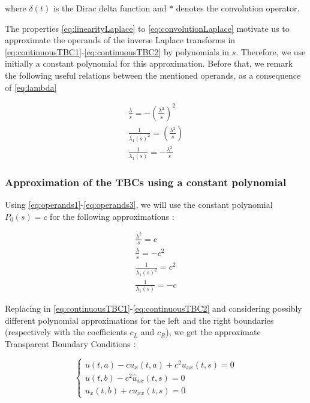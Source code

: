 \noindent where $\delta (t)$ is the Dirac delta function and $*$ denotes the convolution operator.

\indent The properties \eqref{eq:linearityLaplace} to \eqref{eq:convolutionLaplace} motivate us to approximate the operands of the inverse Laplace transforms in \eqref{eq:continuousTBC1}-\eqref{eq:continuousTBC2} by polynomials in $s$. Therefore, we use initially a constant polynomial for this approximation. Before that, we remark the following useful relations between the mentioned operands, as a consequence of \eqref{eq:lambda}

\begin{gather}
	\label{eq:operands1}
	\frac{\lambda}{s}  = -\left( \frac{\lambda^2}{s} \right)^2 \\
	\label{eq:operands2}
	\frac{1}{\lambda_1(s)^2}  = \left( \frac{\lambda^2}{s} \right) \\
	\label{eq:operands3}
	 \frac{1}{\lambda_1(s)}  = -\frac{\lambda^2}{s}
\end{gather}

\subsubsection{Approximation of the TBCs using a constant polynomial}

\indent Using \eqref{eq:operands1}-\eqref{eq:operands3}, we will use the constant polynomial $P_0(s) = c$ for the following approximations :

\begin{gather}
	\label{eq:appP0A}
	\frac{\lambda^2}{s}  = c \\
	\label{eq:appP0B}
	\frac{\lambda}{s}  = -c^2 \\
	\label{eq:appP0C}
	\frac{1}{\lambda_1(s)^2}  = c^2\\ 
	\label{eq:appP0D}
	 \frac{1}{\lambda_1(s)}  = -c 
\end{gather}

\indent Replacing in \eqref{eq:continuousTBC1}-\eqref{eq:continuousTBC2} and considering possibly different polynomial approximations for the left and the right boundaries (respectively with the coefficients $c_L$ and $c_R$), we get the approximate Transparent Boundary Conditions : 

\begin{equation}
\label{eq:appTBCP0}
    \begin{cases}
        u(t,a) - c u_x(t,a)  + c^2  u_{xx}(t,s) = 0 \\
        u(t,b) - c^2    \hat{u}_{xx}(t,s) = 0 \\
        u_x(t,b) + c u_{xx}(t,s)= 0 
    \end{cases}
\end{equation}

